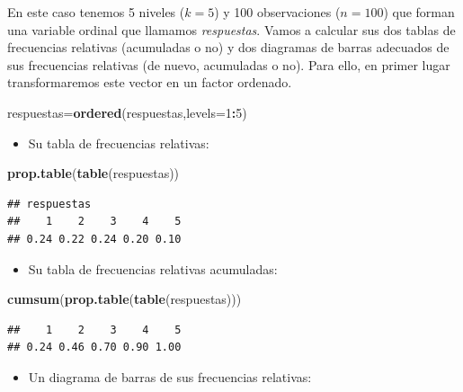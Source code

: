 \documentclass[]{book}
\newenvironment{Shaded}{\begin{snugshade}}{\end{snugshade}}
\newcommand{\DataTypeTok}[1]{\textcolor[rgb]{0.13,0.29,0.53}{#1}}
\newcommand{\DecValTok}[1]{\textcolor[rgb]{0.00,0.00,0.81}{#1}}
\newcommand{\KeywordTok}[1]{\textcolor[rgb]{0.13,0.29,0.53}{\textbf{#1}}}
\newcommand{\NormalTok}[1]{#1}
\newcommand{\OperatorTok}[1]{\textcolor[rgb]{0.81,0.36,0.00}{\textbf{#1}}}
\providecommand{\tightlist}{%
  \setlength{\itemsep}{0pt}\setlength{\parskip}{0pt}}
\theoremstyle{definition}
\theoremstyle{definition}
\theoremstyle{definition}
\theoremstyle{remark}
\begin{document}
En este caso tenemos 5 niveles (\(k=5\)) y 100 observaciones (\(n=100\)) que forman una variable ordinal que llamamos \emph{respuestas}. Vamos a calcular sus dos tablas de frecuencias relativas (acumuladas o no) y dos diagramas de barras adecuados de sus frecuencias relativas (de nuevo, acumuladas o no). Para ello, en primer lugar transformaremos este vector en un factor ordenado.

\begin{Shaded}
\begin{Highlighting}[]
\NormalTok{respuestas=}\KeywordTok{ordered}\NormalTok{(respuestas,}\DataTypeTok{levels=}\DecValTok{1}\OperatorTok{:}\DecValTok{5}\NormalTok{)}
\end{Highlighting}
\end{Shaded}

\begin{itemize}
\tightlist
\item
  Su tabla de frecuencias relativas:
\end{itemize}

\begin{Shaded}
\begin{Highlighting}[]
\KeywordTok{prop.table}\NormalTok{(}\KeywordTok{table}\NormalTok{(respuestas))}
\end{Highlighting}
\end{Shaded}

\begin{verbatim}
## respuestas
##    1    2    3    4    5 
## 0.24 0.22 0.24 0.20 0.10
\end{verbatim}

\begin{itemize}
\tightlist
\item
  Su tabla de frecuencias relativas acumuladas:
\end{itemize}

\begin{Shaded}
\begin{Highlighting}[]
\KeywordTok{cumsum}\NormalTok{(}\KeywordTok{prop.table}\NormalTok{(}\KeywordTok{table}\NormalTok{(respuestas)))}
\end{Highlighting}
\end{Shaded}

\begin{verbatim}
##    1    2    3    4    5 
## 0.24 0.46 0.70 0.90 1.00
\end{verbatim}

\begin{itemize}
\tightlist
\item
  Un diagrama de barras de sus frecuencias relativas:
\end{itemize}
\end{document}
